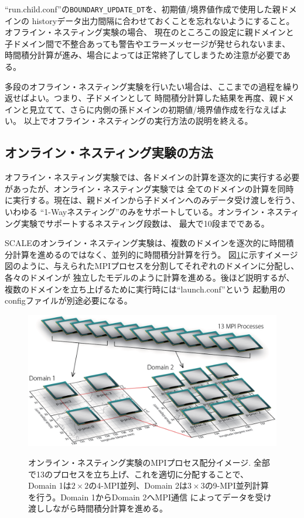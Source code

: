 \noindent ``run.child.conf''の\verb|BOUNDARY_UPDATE_DT|を、初期値/境界値作成で使用した親ドメインの
historyデータ出力間隔に合わせておくことを忘れないようにすること。オフライン・ネスティング実験の場合、
現在のところこの設定に親ドメインと子ドメイン間で不整合あっても警告やエラーメッセージが発せられないまま、
時間積分計算が進み、場合によっては正常終了してしまうため注意が必要である。

多段のオフライン・ネスティング実験を行いたい場合は、ここまでの過程を繰り返せばよい。つまり、子ドメインとして
時間積分計算した結果を再度、親ドメインと見立てて、さらに内側の孫ドメインの初期値/境界値作成を行なえばよい。
以上でオフライン・ネスティングの実行方法の説明を終える。


\subsection{オンライン・ネスティング実験の方法} \label{sec:nest_online}

オフライン・ネスティング実験では、各ドメインの計算を逐次的に実行する必要があったが、オンライン・ネスティング実験では
全てのドメインの計算を同時に実行する。現在は、親ドメインから子ドメインへのみデータ受け渡しを行う、いわゆる
``1-Wayネスティング''のみをサポートしている。オンライン・ネスティング実験でサポートするネスティング段数は、
最大で10段までである。

SCALEのオンライン・ネスティング実験は、複数のドメインを逐次的に時間積分計算を進めるのではなく、並列的に時間積分計算を行う。
図\ref{fig_mpisplit}に示すイメージ図のように、与えられたMPIプロセスを分割してそれぞれのドメインに分配し、各々のドメインが
独立したモデルのように計算を進める。後ほど説明するが、複数のドメインを立ち上げるために実行時には``launch.conf''という
起動用のconfigファイルが別途必要になる。

\begin{figure}[t]
\begin{center}
  \includegraphics[width=0.8\hsize]{./figure/mpisplit_nesting.eps}\\
  \caption{オンライン・ネスティング実験のMPIプロセス配分イメージ. 全部で13のプロセスを立ち上げ、これを適切に分配することで、
           Domain 1は$2 \times 2$の4-MPI並列、Domain 2は$3 \times 3$の9-MPI並列計算を行う。Domain 1からDomain 2へMPI通信
           によってデータを受け渡ししながら時間積分計算を進める。}
  \label{fig_mpisplit}
\end{center}
\end{figure}



